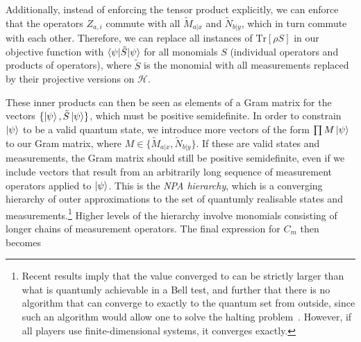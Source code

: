 \documentclass[10pt, a4paper]{article}
\numberwithin{equation}{section} %
\theoremstyle{definition}
\theoremstyle{plain}
\newcommand{\?}{\mathrel{?}} %
\newcommand{\Tr}{\mathrm{Tr}} %
\newcommand{\Hs}{\mathcal{H}} %
\begin{document}
      Additionally, instead of enforcing the tensor product explicitly, we can enforce that the operators \(Z_{a,i}\) commute with all \(\tilde{M}_{a|x}\) and \(\tilde{N}_{b|y}\), which in turn commute with each other. Therefore, we can replace all instances of \(\Tr\left[\rho S\right]\) in our objective function with \(\braket{\psi|\tilde{S}|\psi}\) for all monomials \(S\) (individual operators and products of operators), where \(\tilde{S}\) is the monomial with all measurements replaced by their projective versions on \(\Hs\). 

      These inner products can then be seen as elements of a Gram matrix for the vectors \(\{\ket{\psi}, \tilde{S}\ket{\psi}\}\), which must be positive semidefinite. In order to constrain \(\ket{\psi}\) to be a valid quantum state, we introduce more vectors of the form \(\prod M\ket{\psi}\) to our Gram matrix, where \(M \in \{\tilde{M}_{a|x}, \tilde{N}_{b|y}\}\). If these are valid states and measurements, the Gram matrix should still be positive semidefinite, even if we include vectors that result from an arbitrarily long sequence of measurement operators applied to \(\ket{\psi}\). This is the \emph{NPA hierarchy}, which is a converging hierarchy of outer approximations to the set of quantumly realisable states and measurements.\footnote{Recent results imply that the value converged to can be strictly larger than what is quantumly achievable in a Bell test, and further that there is no algorithm that can converge to exactly to the quantum set from outside, since such an algorithm would allow one to solve the halting problem~\cite{MIPRE}. However, if all players use finite-dimensional systems, it converges exactly.} Higher levels of the hierarchy involve monomials consisting of longer chains of measurement operators. The final expression for \(C_m\) then becomes
\end{document}
